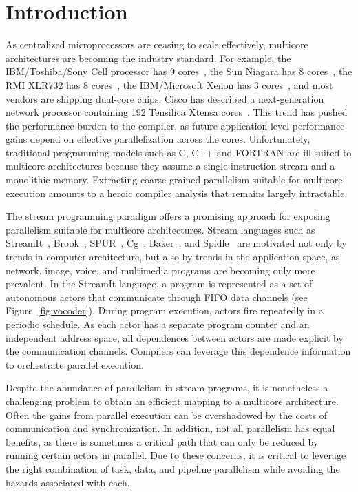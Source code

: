 \section{Introduction}


As centralized microprocessors are ceasing to scale effectively,
multicore architectures are becoming the industry standard.  For
example, the IBM/Toshiba/Sony Cell processor has 9
cores~\cite{Cell-hpca}, the Sun Niagara has 8 cores~\cite{Niagara},
the RMI XLR732 has 8 cores~\cite{RMI-web}, the IBM/Micro\-soft Xenon
has 3 cores~\cite{xbox360}, and most vendors are shipping dual-core
chips.  Cisco has described a next-generation network processor
containing 192 Tensilica Xtensa cores~\cite{etherton05ancs}.
This trend has pushed the performance burden to the compiler, as
future application-level performance gains depend on effective
parallelization across the cores.  Unfortunately, traditional
programming models such as C, C++ and FORTRAN are ill-suited to
multicore architectures because they assume a single instruction
stream and a monolithic memory.  Extracting coarse-grained parallelism
suitable for multicore execution amounts to a heroic compiler analysis
that remains largely intractable.

The stream programming paradigm offers a promising approach for
exposing parallelism suitable for multicore architectures.  Stream
languages such as StreamIt~\cite{streamitcc}, Brook~\cite{brook04},
SPUR~\cite{spur05samos}, Cg~\cite{cg03}, Baker~\cite{Baker}, and
Spidle~\cite{spidle03} are motivated not only by trends in computer
architecture, but also by trends in the application space, as network,
image, voice, and multimedia programs are becoming only more
prevalent.  In the StreamIt language, a program is represented as a
set of autonomous actors that communicate through FIFO data channels
(see Figure~\ref{fig:vocoder}).  During program execution, actors fire
repeatedly in a periodic schedule.  As each actor has a separate
program counter and an independent address space, all dependences
between actors are made explicit by the communication channels.
Compilers can leverage this dependence information to orchestrate
parallel execution.

Despite the abundance of parallelism in stream programs, it is
nonetheless a challenging problem to obtain an efficient mapping to a
multicore architecture.  Often the gains from parallel execution can
be overshadowed by the costs of communication and synchronization.  In
addition, not all parallelism has equal benefits, as there is
sometimes a critical path that can only be reduced by running certain
actors in parallel.  Due to these concerns, it is critical to leverage
the right combination of task, data, and pipeline parallelism while
avoiding the hazards associated with each.

